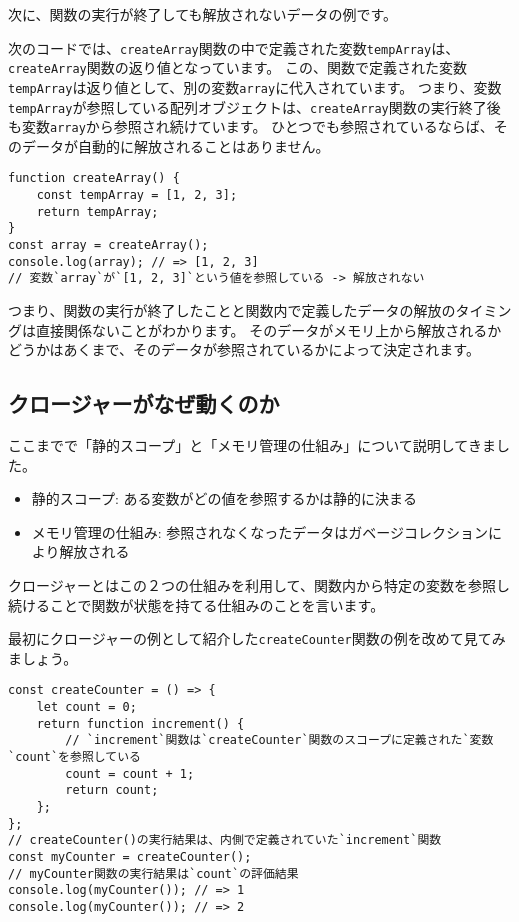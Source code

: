 次に、関数の実行が終了しても解放されないデータの例です。

次のコードでは、\texttt{createArray}関数の中で定義された変数\texttt{tempArray}は、\texttt{createArray}関数の返り値となっています。
この、関数で定義された変数\texttt{tempArray}は返り値として、別の変数\texttt{array}に代入されています。
つまり、変数\texttt{tempArray}が参照している配列オブジェクトは、\texttt{createArray}関数の実行終了後も変数\texttt{array}から参照され続けています。
ひとつでも参照されているならば、そのデータが自動的に解放されることはありません。

\begin{lstlisting}
function createArray() {
    const tempArray = [1, 2, 3];
    return tempArray;
}
const array = createArray();
console.log(array); // => [1, 2, 3]
// 変数`array`が`[1, 2, 3]`という値を参照している -> 解放されない
\end{lstlisting}

つまり、関数の実行が終了したことと関数内で定義したデータの解放のタイミングは直接関係ないことがわかります。
そのデータがメモリ上から解放されるかどうかはあくまで、そのデータが参照されているかによって決定されます。

\hypertarget{why-closure-work}{%
\subsection{クロージャーがなぜ動くのか}\label{why-closure-work}}

ここまでで「静的スコープ」と「メモリ管理の仕組み」について説明してきました。

\begin{itemize}
\item
  静的スコープ: ある変数がどの値を参照するかは静的に決まる
\item
  メモリ管理の仕組み:
  参照されなくなったデータはガベージコレクションにより解放される
\end{itemize}

クロージャーとはこの２つの仕組みを利用して、関数内から特定の変数を参照し続けることで関数が状態を持てる仕組みのことを言います。

最初にクロージャーの例として紹介した\texttt{createCounter}関数の例を改めて見てみましょう。

\begin{lstlisting}
const createCounter = () => {
    let count = 0;
    return function increment() {
        // `increment`関数は`createCounter`関数のスコープに定義された`変数`count`を参照している
        count = count + 1;
        return count;
    };
};
// createCounter()の実行結果は、内側で定義されていた`increment`関数
const myCounter = createCounter();
// myCounter関数の実行結果は`count`の評価結果
console.log(myCounter()); // => 1
console.log(myCounter()); // => 2
\end{lstlisting}

